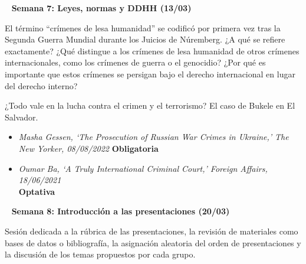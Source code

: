 \documentclass[11pt, a4paper]{article}
\begin{document}
\begin{center} 
\begin{minipage}{6in}
\begin{flushleft}
{\color{darkgreen}{\Rectangle}} ~ \textbf{{\large{Semana 7: Leyes, normas y DDHH (13/03)}}} \\
\end{flushleft}
El término “crímenes de lesa humanidad” se codificó por primera vez tras la Segunda Guerra Mundial durante los Juicios de Núremberg. ¿A qué se refiere exactamente?
¿Qué distingue a los crímenes de lesa humanidad de otros crímenes internacionales, como los crímenes de guerra o el genocidio? ¿Por qué es importante que estos crímenes se persigan bajo el derecho internacional en lugar del derecho interno?\vspace{0,5em}

¿Todo vale en la lucha contra el crimen y el terrorismo? El caso de Bukele en El Salvador.
\begin{itemize}

    \item \emph{Masha Gessen, ‘The Prosecution of Russian War Crimes in Ukraine,’ The New Yorker, 08/08/2022} \textbf{Obligatoria}
    
    \item \emph{Oumar Ba, ‘A Truly International Criminal Court,’ Foreign Affairs, 18/06/2021} \\ \textbf{Optativa}

\end{itemize}
\end{minipage}
\end{center}

\begin{center} 
\begin{minipage}{6in}
\begin{flushleft}
{\color{darkgreen}{\Rectangle}} ~ \textbf{{\large{Semana 8: Introducción a las presentaciones (20/03)}}} \\
\end{flushleft}

Sesión dedicada a la rúbrica de las presentaciones, la revisión de materiales como bases de datos o bibliografía, la asignación aleatoria del orden de presentaciones y la discusión de los temas propuestos por cada grupo.

\end{minipage}
\end{center}
\end{document}
